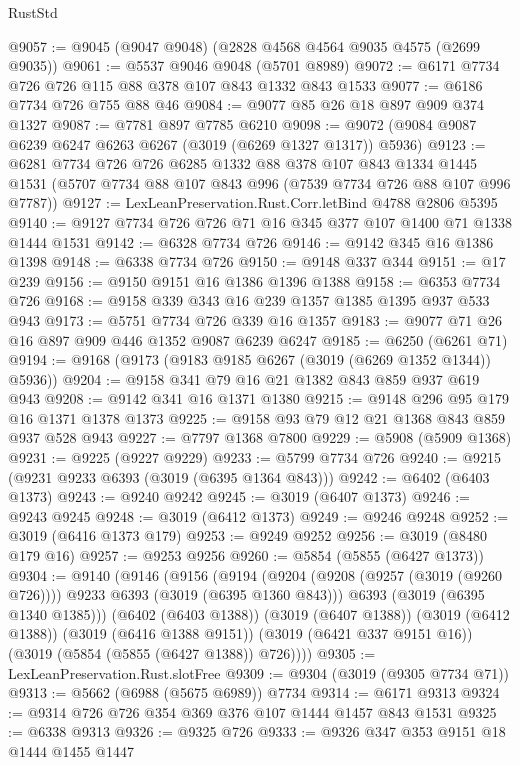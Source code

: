 \begin{lexlean}{RustStd}
\begin{coremodule}
@9057 := @9045 (@9047 @9048) (@2828 @4568 @4564 @9035 @4575 (@2699 @9035))
@9061 := @5537 @9046 @9048 (@5701 @8989)
@9072 := @6171 @7734 @726 @726 @115 @88 @378 @107 @843 @1332 @843 @1533
@9077 := @6186 @7734 @726 @755 @88 @46
@9084 := @9077 @85 @26 @18 @897 @909 @374 @1327
@9087 := @7781 @897 @7785 @6210
@9098 := @9072 (@9084 @9087 @6239 @6247 @6263 @6267 (@3019 (@6269 @1327 @1317)) @5936)
@9123 := @6281
    @7734
    @726
    @726
    @6285
    @1332
    @88
    @378
    @107
    @843
    @1334
    @1445
    @1531
    (@5707 @7734 @88 @107 @843 @996 (@7539 @7734 @726 @88 @107 @996 @7787))
@9127 := LexLeanPreservation.Rust.Corr.letBind @4788 @2806 @5395
@9140 := @9127 @7734 @726 @726 @71 @16 @345 @377 @107 @1400 @71 @1338 @1444 @1531
@9142 := @6328 @7734 @726
@9146 := @9142 @345 @16 @1386 @1398
@9148 := @6338 @7734 @726
@9150 := @9148 @337 @344
@9151 := @17 @239
@9156 := @9150 @9151 @16 @1386 @1396 @1388
@9158 := @6353 @7734 @726
@9168 := @9158 @339 @343 @16 @239 @1357 @1385 @1395 @937 @533 @943
@9173 := @5751 @7734 @726 @339 @16 @1357
@9183 := @9077 @71 @26 @16 @897 @909 @446 @1352 @9087 @6239 @6247
@9185 := @6250 (@6261 @71)
@9194 := @9168 (@9173 (@9183 @9185 @6267 (@3019 (@6269 @1352 @1344)) @5936))
@9204 := @9158 @341 @79 @16 @21 @1382 @843 @859 @937 @619 @943
@9208 := @9142 @341 @16 @1371 @1380
@9215 := @9148 @296 @95 @179 @16 @1371 @1378 @1373
@9225 := @9158 @93 @79 @12 @21 @1368 @843 @859 @937 @528 @943
@9227 := @7797 @1368 @7800
@9229 := @5908 (@5909 @1368)
@9231 := @9225 (@9227 @9229)
@9233 := @5799 @7734 @726
@9240 := @9215 (@9231 @9233 @6393 (@3019 (@6395 @1364 @843)))
@9242 := @6402 (@6403 @1373)
@9243 := @9240 @9242
@9245 := @3019 (@6407 @1373)
@9246 := @9243 @9245
@9248 := @3019 (@6412 @1373)
@9249 := @9246 @9248
@9252 := @3019 (@6416 @1373 @179)
@9253 := @9249 @9252
@9256 := @3019 (@8480 @179 @16)
@9257 := @9253 @9256
@9260 := @5854 (@5855 (@6427 @1373))
@9304 := @9140
    (@9146
      (@9156
        (@9194
          (@9204 (@9208 (@9257 (@3019 (@9260 @726)))) @9233 @6393 (@3019 (@6395 @1360 @843)))
          @6393
          (@3019 (@6395 @1340 @1385)))
        (@6402 (@6403 @1388))
        (@3019 (@6407 @1388))
        (@3019 (@6412 @1388))
        (@3019 (@6416 @1388 @9151))
        (@3019 (@6421 @337 @9151 @16))
        (@3019 (@5854 (@5855 (@6427 @1388)) @726))))
@9305 := LexLeanPreservation.Rust.slotFree
@9309 := @9304 (@3019 (@9305 @7734 @71))
@9313 := @5662 (@6988 (@5675 @6989)) @7734
@9314 := @6171 @9313
@9324 := @9314 @726 @726 @354 @369 @376 @107 @1444 @1457 @843 @1531
@9325 := @6338 @9313
@9326 := @9325 @726
@9333 := @9326 @347 @353 @9151 @18 @1444 @1455 @1447

\end{coremodule}
\end{lexlean}
